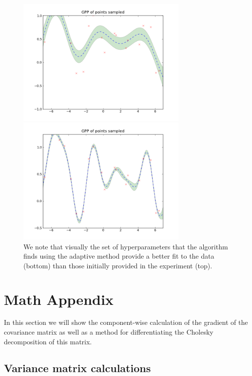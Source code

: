 \documentclass[phd,tocprelim]{cornell}
\begin{document}
\begin{figure}[hpt]
 	\centerline{\includegraphics[width=0.75\textwidth]{figures/EPI/hyper_update_GPP_pre.png}}
    \centerline{\includegraphics[width=0.75\textwidth]{figures/EPI/hyper_update_GPP_post.png}}
    \caption[Evolution of hyperparameters]{We note that visually the set of hyperparameters that the algorithm finds using the adaptive method provide a better fit to the data (bottom) than those initially provided in the experiment (top).}
 	\label{fig:EPI_hyper_2}
\end{figure}


\section{Math Appendix}

In this section we will show the component-wise calculation of the gradient of the covariance matrix as well as a method for differentiating the Cholesky decomposition of this matrix.

\subsection{Variance matrix calculations}
\label{EPI_imp_var}
\end{document}
